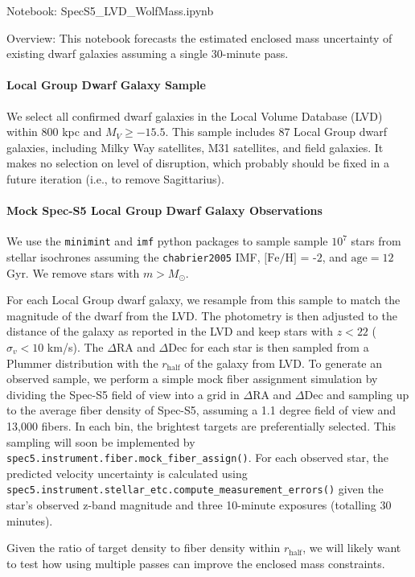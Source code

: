 Notebook: 
SpecS5_LVD_WolfMass.ipynb

Overview:
This notebook forecasts the estimated enclosed mass uncertainty of existing dwarf galaxies assuming a single 30-minute pass.

\paragraph{Local Group Dwarf Galaxy Sample}
We select all confirmed dwarf galaxies in the Local Volume Database (LVD) within 800 kpc and $M_V \geq -15.5$. This sample includes 87 Local Group dwarf galaxies, including Milky Way satellites, M31 satellites, and field galaxies. It makes no selection on level of disruption, which probably should be fixed in a future iteration (i.e., to remove Sagittarius).

\paragraph{Mock Spec-S5 Local Group Dwarf Galaxy Observations}
We use the \texttt{minimint} and \texttt{imf} python packages to sample sample $10^7$ stars from stellar isochrones assuming the \texttt{chabrier2005} IMF, $\text{[Fe/H] = -2}$, and $\text{age} = 12$ Gyr. We remove stars with $m > M_\odot$. 

For each Local Group dwarf galaxy, we resample from this sample to match the magnitude of the dwarf from the LVD. The photometry is then adjusted to the distance of the galaxy as reported in the LVD and keep stars with $z < 22$ ($\sigma_v <10$ km/s). The $\Delta$RA and $\Delta$Dec for each star is then sampled from a Plummer distribution with the $r_\text{half}$ of the galaxy from LVD. To generate an observed sample, we perform a simple mock fiber assignment simulation by dividing the Spec-S5 field of view into a grid in $\Delta$RA and $\Delta$Dec and sampling up to the average fiber density of Spec-S5, assuming a 1.1 degree field of view and 13,000 fibers. In each bin, the brightest targets are preferentially selected. This sampling will soon be implemented by \texttt{spec5.instrument.fiber.mock_fiber_assign()}. For each observed star, the predicted velocity uncertainty is calculated using \texttt{spec5.instrument.stellar_etc.compute_measurement_errors()} given the star’s observed z-band magnitude and three 10-minute exposures (totalling 30 minutes). 

Given the ratio of target density to fiber density within $r_\text{half}$, we will likely want to test how using multiple passes can improve the enclosed mass constraints. 

